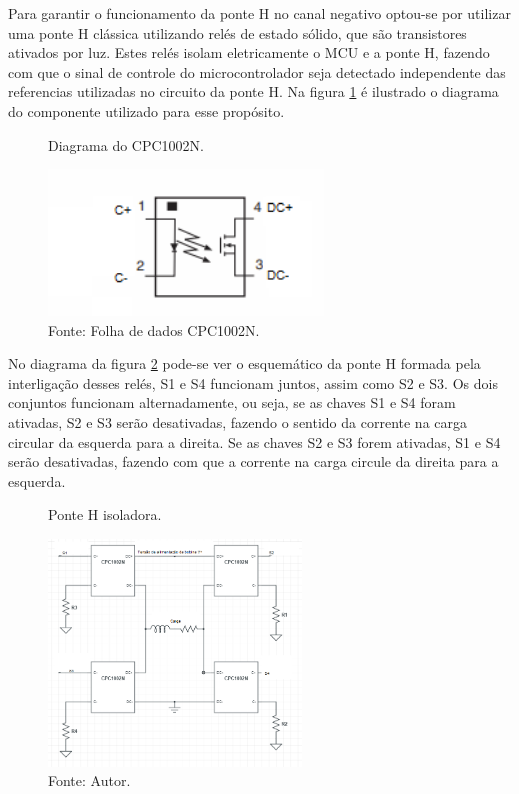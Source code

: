 Para garantir o funcionamento da ponte H no canal negativo optou-se por utilizar uma ponte H clássica \cite{ponteH} utilizando relés de estado sólido, que são transistores ativados por luz. Estes relés isolam eletricamente o MCU e a ponte H, fazendo com que o sinal de controle do microcontrolador seja detectado independente das referencias utilizadas no circuito da ponte H. Na figura \ref{fig:pontHOpt} é ilustrado o diagrama do componente utilizado para esse propósito.

\begin{figure}[H]
    \centering
     \caption{Diagrama do CPC1002N.}
     \includegraphics[width=0.65\textwidth]{./img/imagensExplicacoes/ponteHOpt.png}
     \caption*{Fonte: Folha de dados CPC1002N.}
     \label{fig:pontHOpt}
\end{figure}

No diagrama da figura \ref{fig:pontH} pode-se ver o esquemático da ponte H formada pela interligação desses relés, S1 e S4 funcionam juntos, assim como S2 e S3. Os dois conjuntos funcionam alternadamente, ou seja, se as chaves S1 e S4 foram ativadas, S2 e S3 serão desativadas, fazendo o sentido da corrente na carga circular da esquerda para a direita. Se as chaves S2 e S3 forem ativadas, S1 e S4 serão desativadas, fazendo com que a corrente na carga circule da direita para a esquerda.

\begin{figure}[H]
    \centering
     \caption{Ponte H isoladora.}
     \includegraphics[width=0.6\textwidth]{./img/imagensExplicacoes/ponte_h_rele.png}
     \caption*{Fonte: Autor.}
     \label{fig:pontH}
\end{figure}

